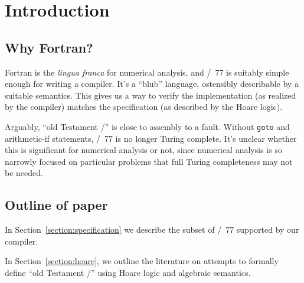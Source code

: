 \section{Introduction}

\subsection{Why Fortran?}
Fortran is the \emph{lingua franca} for numerical analysis, and
\FORTRAN/~77 is suitably simple enough for writing a compiler. It's a
``blub'' language, ostensibly describable by a suitable semantics. This
gives us a way to verify the implementation (as realized by the
compiler) matches the specification (as described by the Hoare logic).

Arguably, ``old Testament \FORTRAN/'' is close to assembly to a fault.
Without \texttt{goto} and arithmetic-if statements, \FORTRAN/~77 is no
longer Turing complete. It's unclear whether this is significant for
numerical analysis or not, since numerical analysis is so narrowly
focused on particular problems that full Turing completeness may not be
needed. 

\subsection{Outline of paper}
In Section~\ref{section:specification} we describe the subset of
\FORTRAN/~77 supported by our compiler.

In Section~\ref{section:hoare}, we outline the literature on attempts to
formally define ``old Testament \FORTRAN/'' using Hoare logic and
algebraic semantics.
